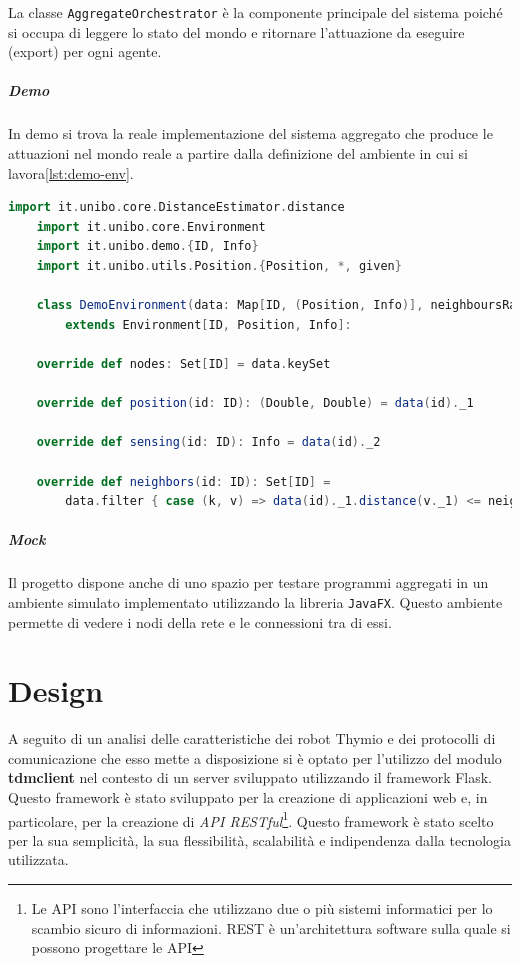 \documentclass[12pt,a4paper,openright,twoside]{book}
\begin{document}
La classe \verb|AggregateOrchestrator| è la componente principale del sistema poiché si occupa di leggere lo stato del mondo e ritornare l'attuazione da eseguire (export) per ogni agente.

\paragraph{Demo}
In demo si trova la reale implementazione del sistema aggregato che produce le attuazioni nel mondo reale a partire dalla definizione del ambiente in cui si lavora\cref{lst:demo-env}.

\begin{lstlisting}[language=Scala, label={lst:demo-env}, caption={Definizione dell'ambiente}]
    import it.unibo.core.DistanceEstimator.distance
    import it.unibo.core.Environment
    import it.unibo.demo.{ID, Info}
    import it.unibo.utils.Position.{Position, *, given}

    class DemoEnvironment(data: Map[ID, (Position, Info)], neighboursRadius: Double)
        extends Environment[ID, Position, Info]:

    override def nodes: Set[ID] = data.keySet

    override def position(id: ID): (Double, Double) = data(id)._1

    override def sensing(id: ID): Info = data(id)._2

    override def neighbors(id: ID): Set[ID] =
        data.filter { case (k, v) => data(id)._1.distance(v._1) <= neighboursRadius }.keys.toSet
\end{lstlisting}

\paragraph{Mock}
Il progetto dispone anche di uno spazio per testare programmi aggregati in un ambiente simulato implementato utilizzando la libreria \verb|JavaFX|. Questo ambiente permette di vedere i nodi della rete e le connessioni tra di essi.


\chapter{Design}
\label{chap:design}

A seguito di un analisi delle caratteristiche dei robot Thymio e dei protocolli di comunicazione che esso mette a disposizione si è optato per l'utilizzo del modulo \textbf{tdmclient} nel contesto di un server sviluppato utilizzando il framework Flask. Questo framework è stato sviluppato per la creazione di applicazioni web e, in particolare, per la creazione di \textit{API RESTful}\footnote{Le API sono l'interfaccia che utilizzano due o più sistemi informatici per lo scambio sicuro di informazioni. REST è un'architettura software sulla quale si possono progettare le API}. Questo framework è stato scelto per la sua semplicità, la sua flessibilità, scalabilità e indipendenza dalla tecnologia utilizzata. 
\end{document}
